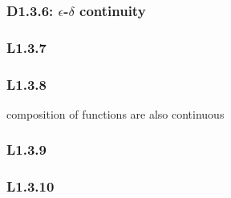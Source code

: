 \documentclass{article}
\begin{document}
\begin{multicols*}{3}
\subsubsection*{D1.3.6: $\epsilon$-$\delta$ continuity}

\subsubsection*{L1.3.7}

\subsubsection*{L1.3.8}
composition of functions are also continuous

\subsubsection*{L1.3.9}

\subsubsection*{L1.3.10}

\end{multicols*}
\end{document}
